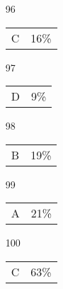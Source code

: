 \documentclass[12pt]{article}
\begin{document}
\begin{multicols}{5}
\begin{enumerate}
\item[]
\item[96] \begin{tabular}{cc} C & 16\%\end{tabular}
\item[97] \begin{tabular}{cc} D & 9\%\end{tabular}
\item[98] \begin{tabular}{cc} B & 19\%\end{tabular}
\item[99] \begin{tabular}{cc} A & 21\%\end{tabular}
\item[100] \begin{tabular}{cc} C & 63\%\end{tabular}

\item[]

\end{enumerate}
\end{multicols}
\clearpage
\end{document}
